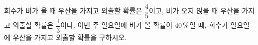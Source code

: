 희수가 비가 올 때 우산을 가지고 외출할 확률은 $\dfrac{4}{5}$이고, 비가 오지 않을 때 우산을 가지고 외출할 확률은 $\dfrac{1}{3}$이다. 이번 주 일요일에 비가 올 확률이 $40\mkern3mu \%$일 때, 희수가 일요일에 우산을 가지고 외출할 확률을 구하시오.
